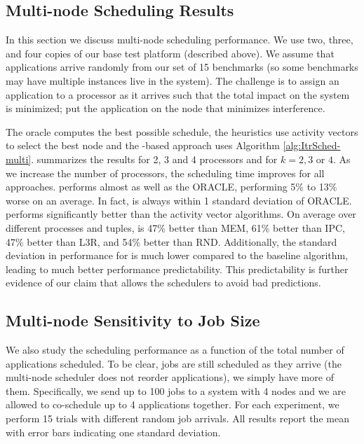 \subsection{Multi-node Scheduling Results}
\label{sec:sched-multi-node}
In this section we discuss multi-node scheduling performance. We use
two, three, and four copies of our base test platform (described
above).  We assume that applications arrive randomly from our set of
15 benchmarks (so some benchmarks may have multiple instances live in
the system).  The challenge is to assign an application to a
processor as it arrives such that the total impact on the system is
minimized; \ie put the application on the node that minimizes
interference.

The oracle computes the best possible schedule, the heuristics use
activity vectors to select the best node and the \SYSTEM{}-based
approach uses Algorithm \ref{alg:ItrSched-multi}.
 summarizes the results for 2, 3 and 4
processors and for $k = 2,3$ or $4$. As we increase the number of
processors, the scheduling time improves for all approaches. \SYSTEM{}
performs almost as well as the ORACLE, performing 5\% to 13\% worse on
an average.  In fact, \SYSTEM{} is always within 1 standard deviation
of ORACLE. \SYSTEM{} performs significantly better than the activity
vector algorithms. On average over different processes and tuples,
\SYSTEM{} is 47\% better than MEM, 61\% better than IPC, 47\% better
than L3R, and 54\% better than RND.  Additionally, the standard
deviation in performance for \SYSTEM{} is much lower compared to the
baseline algorithm, leading to much better performance predictability.
This predictability is further evidence of our claim that \SYSTEM{}
allows the schedulers to avoid bad predictions.

\subsection{Multi-node Sensitivity to Job Size}
\label{sec:exp:multi-node-job}
We also study the scheduling performance as a function of the total
number of applications scheduled. To be clear, jobs are still
scheduled as they arrive (the multi-node scheduler does not reorder
applications), we simply have more of them.  Specifically, we send up
to 100 jobs to a system with 4 nodes and we are allowed to co-schedule
up to 4 applications together.  For each experiment, we perform 15
trials with different random job arrivals.  All results report the
mean with error bars indicating one standard deviation.


